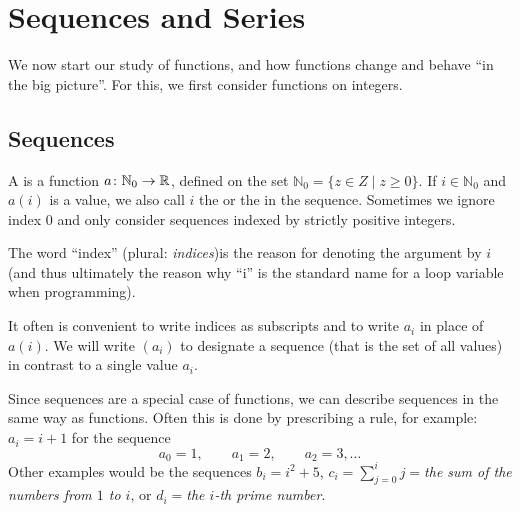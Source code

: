 \chapter{Sequences and Series}
\label{chseqs}

We now start our study of functions, and how functions change and behave ``in the big
picture''. For this, we first consider functions on integers.

\section{Sequences}
\label{secsequences}

\begin{defn}
A  is a function $a\colon \mathbb{N}_0\to{\mathbb R}$, defined on the
set $\mathbb{N}_0=\{z\in Z\mid
z\ge 0\}$. If $i\in \mathbb{N}_0$ and $a(i)$ is a value, we also call $i$ the  or
the  in the sequence.
Sometimes we ignore index $0$ and only consider sequences indexed by strictly positive
integers.
\end{defn}

The word ``index'' (plural: {\em indices})is the reason for denoting the argument by $i$ (and thus ultimately
the reason why ``i'' is the standard name for a loop variable when programming).

It often is convenient to write indices as subscripts and to write $a_i$ in place of
$a(i)$. We will write $(a_i)$ to designate a sequence (that is the set of all values) in
contrast to a single value $a_i$.
\smallskip

Since sequences are a special case of functions, we can describe sequences in the same
way as functions. Often this is done by prescribing a rule, for example:
$a_i=i+1$ for the sequence
\[
a_0=1,\qquad a_1=2,\qquad a_2=3,\ldots
\]
Other examples would be the sequences $b_i=i^2+5$,
$\displaystyle c_i=\sum_{j=0}^i j=${\em the sum
of the numbers from $1$ to $i$}, or $d_i=${\em the $i$-th prime number}.
\smallskip

